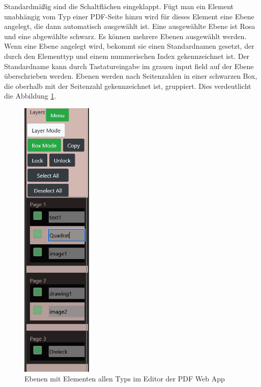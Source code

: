 Standardmäßig sind die Schaltflächen eingeklappt. Fügt man ein Element unabhängig vom Typ einer PDF-Seite hinzu wird für dieses Element eine Ebene angelegt, die dann automatisch ausgewählt ist. Eine ausgewählte Ebene ist Rosa und eine abgewählte schwarz. Es können mehrere Ebenen ausgewählt werden. Wenn eine Ebene angelegt wird, bekommt sie einen Standardnamen gesetzt, der durch den Elementtyp und einem nummerischen Index gekennzeichnet ist. Der Standardname kann durch Tastatureingabe im grauen input field auf der Ebene überschrieben werden. Ebenen werden nach Seitenzahlen in einer schwarzen Box, die oberhalb mit der Seitenzahl gekennzeichnet ist, gruppiert. Dies verdeutlicht die Abbildung \ref{fig:ebenen}.   

\begin{figure}[!htbp]
	\centering
	\includegraphics[width=0.3\textwidth]{"images/ebenen.png"}
	\caption{Ebenen mit Elementen allen Typs im Editor der PDF Web App}
	\label{fig:ebenen}
\end{figure}

